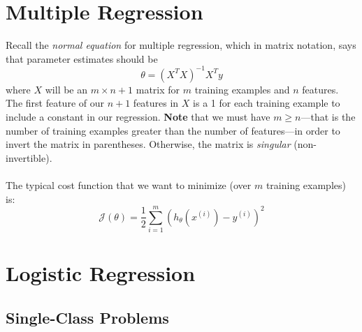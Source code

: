 \documentclass[12pt]{article}
\begin{document}
\section{Multiple Regression}

Recall the \emph{normal equation} for multiple regression, which
in matrix notation, says that parameter estimates should be
   \[ \theta = (X^T X)^{-1} X^T y\]
where $X$ will be an $m\times n+1$ matrix for $m$ training examples
and $n$ features.  The first feature of our $n+1$ features in $X$
is a 1 for each training example to include a constant in our 
regression.
\textbf{Note} 
that we must have $m\geq n$---that is the number of training
examples greater than the number of features---in order to invert
the matrix in parentheses. Otherwise, the matrix is
\emph{singular} (non-invertible).
\\
\\
The typical cost function that we want to minimize (over $m$
training examples) is:
\begin{equation}
   \label{cost}
   \mathcal{J}(\theta) = \frac{1}{2} \sum^m_{i=1} (h_\theta(x^{(i)}) - 
      y^{(i)})^2 
\end{equation}


\section{Logistic Regression}

\subsection{Single-Class Problems}
\end{document}
